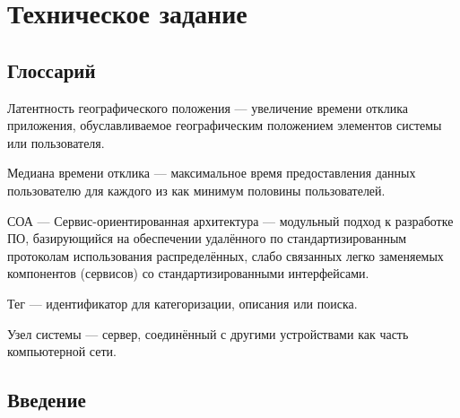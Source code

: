 \documentclass{bmstu-gost-7-32}
\begin{document}
\chapter*{Техническое задание}

\section*{Глоссарий}

Латентность географического положения — увеличение времени отклика приложения, обуславливаемое географическим положением элементов системы или пользователя.

Медиана времени отклика — максимальное время предоставления данных пользователю для каждого из как минимум половины пользователей.

СОА — Сервис-ориентированная архитектура — модульный подход к разработке ПО, базирующийся на обеспечении удалённого по стандартизированным протоколам использования распределённых, слабо связанных легко заменяемых компонентов (сервисов) со стандартизированными интерфейсами.

Тег — идентификатор для категоризации, описания или поиска.

Узел системы — сервер, соединённый с другими устройствами как часть компьютерной сети.


\section{Введение}


\end{document}
